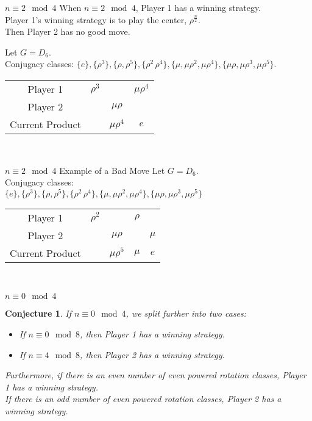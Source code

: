 \documentclass{beamer}
\newtheorem{conjecture}{Conjecture}
\begin{document}
\begin{frame}{$n\equiv 2 \mod 4$}
When $n\equiv 2 \mod 4$, Player 1 has a winning strategy. \\
\medskip
Player 1's winning strategy  is to play the center, $\rho^{\frac{n}{2}}$.\\
\medskip
Then Player 2 has no good move. 
\bigskip

Let $G=D_6$. \\
\medskip
Conjugacy classes: $\{e\},\{\rho^3\}, \{\rho, \rho^5\}, \{\rho^2\, \rho^4\}, \{\mu, \mu\rho^2, \mu\rho^4\}, \{\mu\rho, \mu\rho^3, \mu\rho^5\}$. \\
\medskip


 \begin{tabular}{c|ccc}
    \hline
        Player 1 & $\rho^3$ & & $\mu\rho^4$ \\
        Player 2 & & $\mu\rho$ \\
    \hline
    Current Product & & $\mu\rho^4$ & $e$ 
    \end{tabular}\\
\end{frame}

\begin{frame}{$n\equiv 2 \mod 4$ Example of a Bad Move}
Let $G=D_6$. \\
\medskip
Conjugacy classes: \\
\medskip
$\{e\},\{\rho^3\}, \{\rho, \rho^5\}, \{\rho^2\, \rho^4\}, \{\mu, \mu\rho^2, \mu\rho^4\}, \{\mu\rho, \mu\rho^3, \mu\rho^5\}$ \\
\medskip
 \begin{tabular}{c|cccc}
    \hline
        Player 1 & $\rho^2$ & & $\rho$ \\
        Player 2 & & $\mu\rho$ & & $\mu$\\
    \hline
    Current Product & & $\mu\rho^5$ & $\mu$ & $e$
    \end{tabular}\\
\end{frame}

\begin{frame}{$n\equiv 0 \mod 4$}

\begin{conjecture}
If $n\equiv0 \mod 4$, we split further into two cases: \\
\begin{itemize}
    \item If $n\equiv 0 \mod 8$, then Player 1 has a winning strategy.\\
    \item If $n\equiv 4 \mod 8$, then Player 2 has a winning strategy. 
\end{itemize}
\bigskip

Furthermore, if there is an even number of even powered rotation classes, Player 1 has a winning strategy. \\
\medskip
If there is an odd number of even powered rotation classes, Player 2 has a winning strategy. 
\end{conjecture}
\end{frame}
\end{document}
